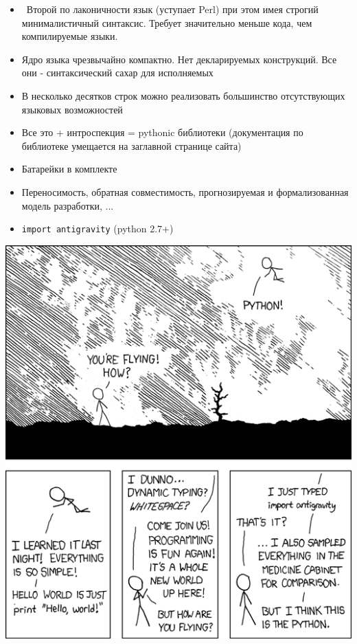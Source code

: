\documentclass{article}
\begin{document}
\begin{itemize}
    \item ~Второй по лаконичности язык (уступает Perl) при этом имея строгий 
            минималистичный синтаксис. Требует значительно меньше кода, чем компилируемые языки.
    \item Ядро языка чрезвычайно компактно. Нет декларируемых конструкций. 
            Все они - синтаксический сахар для исполняемых
    \item В несколько десятков строк можно реализовать большинство отсутствующих языковых возможностей 
    \item Все это + интроспекция = pythonic библиотеки 
        (документация по библиотеке умещается на заглавной странице сайта)
    \item Батарейки в комплекте
    \item Переносимость, обратная совместимость, прогнозируемая и формализованная модель разработки, ...
\end{itemize}
\newpage

\begin{itemize}
    \item \lstinline!import antigravity! (python 2.7+)
\end{itemize}
\includegraphics[scale=0.6]{files/antigravity.png}
\newpage
\end{document}
